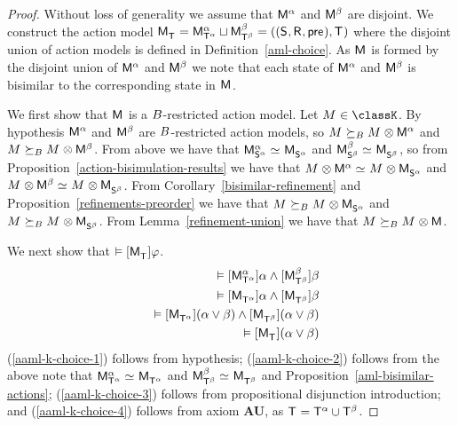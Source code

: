\begin{proof}
Without loss of generality we assume that $\aModel[\alpha]$ and $\aModel[\beta]$ are disjoint.
We construct the action model $\aPModel{\aStatesT} = \aPModel[\alpha]{\aStatesT[\alpha]} \choice \aPModel[\beta]{\aStatesT[\beta]} = \aPModelTuple{\aStatesT}$ where the disjoint union of action models is defined in Definition~\ref{aml-choice}.  
As $\aModel$ is formed by the disjoint union of $\aModel[\alpha]$ and $\aModel[\beta]$ we note that each state of $\aModel[\alpha]$ and $\aModel[\beta]$ is bisimilar to the corresponding state in $\aModel$.

We first show that $\aModel$ is a $\agentsB$-restricted action model.
Let $\kModel \in \classK$.
By hypothesis $\aModel[\alpha]$ and $\aModel[\beta]$ are $\agentsB$-restricted action models, so $\kModel \simulatesBs \kModel \exec \aModel[\alpha]$ and $\kModel \simulatesBs \kModel \exec \aModel[\beta]$.
From above we have that $\aPModel[\alpha]{\aStates[\alpha]} \bisimilar \aPModel{\aStates[\alpha]}$ and $\aPModel[\beta]{\aStates[\beta]} \bisimilar \aPModel{\aStates[\beta]}$, so from Proposition~\ref{action-bisimulation-results} we have that $\kModel \exec \aModel[\alpha] \bisimilar \kModel \exec \aPModel{\aStates[\alpha]}$ and $\kModel \exec \aModel[\beta] \bisimilar \kModel \exec \aPModel{\aStates[\beta]}$.
From Corollary~\ref{bisimilar-refinement} and Proposition~\ref{refinements-preorder} we have that 
$\kModel \simulatesBs \kModel \exec \aPModel{\aStates[\alpha]}$ and $\kModel \simulatesBs \kModel \exec \aPModel{\aStates[\beta]}$.
From Lemma~\ref{refinement-union} we have that $\kModel \simulatesBs \kModel \exec \aModel$.

We next show that $\entails \actionA{\aPModel{\aStatesT}} \phi$.
\begin{eqnarray}
    &&\entails \actionA{\aPModel[\alpha]{\aStatesT[\alpha]}} \alpha \land \actionA{\aPModel[\beta]{\aStatesT[\beta]}} \beta \label{aaml-k-choice-1}\\
    &&\entails \actionA{\aPModel{\aStatesT[\alpha]}} \alpha \land \actionA{\aPModel{\aStatesT[\beta]}} \beta \label{aaml-k-choice-2}\\
    &&\entails \actionA{\aPModel{\aStatesT[\alpha]}} (\alpha \lor \beta) \land \actionA{\aPModel{\aStatesT[\beta]}} (\alpha \lor \beta) \label{aaml-k-choice-3}\\
    &&\entails \actionA{\aPModel{\aStatesT}} (\alpha \lor \beta) \label{aaml-k-choice-4}
\end{eqnarray}
(\ref{aaml-k-choice-1}) follows from hypothesis;
(\ref{aaml-k-choice-2}) follows from the above note that $\aPModel[\alpha]{\aStatesT[\alpha]} \bisimilar \aPModel{\aStatesT[\alpha]}$ and $\aPModel[\beta]{\aStatesT[\beta]} \bisimilar \aPModel{\aStatesT[\beta]}$ and Proposition~\ref{aml-bisimilar-actions};
(\ref{aaml-k-choice-3}) follows from propositional disjunction introduction; and
(\ref{aaml-k-choice-4}) follows from \axiomAamlK{} axiom {\bf AU}, as $\aStatesT = \aStatesT[\alpha] \cup \aStatesT[\beta]$.


\end{proof}
